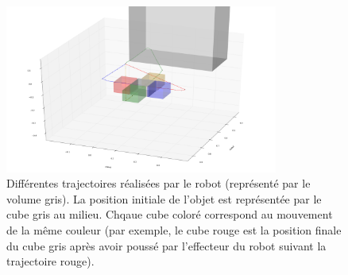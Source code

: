 \documentclass[draft]{llncs}
\begin{document}


\begin{figure}
  \begin{center}
    \includegraphics[width=0.8\textwidth]{figures/trajectories}
  \end{center}
  \caption{Différentes trajectoires réalisées par le robot (représenté par le volume gris). La position initiale de l'objet est représentée par le cube gris au milieu. Chqaue cube coloré correspond au mouvement de la même couleur (par exemple, le cube rouge est la position finale du cube gris après avoir poussé par l'effecteur du robot suivant la trajectoire rouge).}
  \label{fig:trajectories}
\end{figure}
\end{document}
